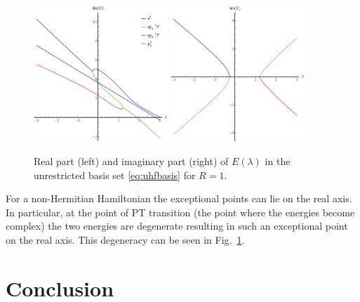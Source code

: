 \documentclass[11pt,a4paper]{article}
\begin{document}
\begin{figure}[h!]
    \centering
    \includegraphics[width=0.45\textwidth]{ReNRJPT.pdf}
    \includegraphics[width=0.45\textwidth]{ImNRJPT.pdf}
    \caption{\centering Real part (left) and imaginary part (right) of $E(\lambda)$ in the unrestricted basis set \eqref{eq:uhfbasis} for $R=1$.}
    \label{fig:UHFPT}
\end{figure}

For a non-Hermitian Hamiltonian the exceptional points can lie on the real axis. In particular, at the point of PT transition (the point where the energies become complex) the two energies are degenerate resulting in such an exceptional point on the real axis. This degeneracy can be seen in Fig.~\ref{fig:UHFPT}.

\section{Conclusion}
\end{document}
